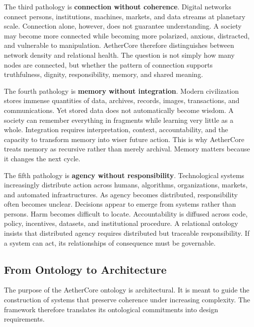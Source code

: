 \documentclass[12pt]{article}
\begin{document}
The third pathology is \textbf{connection without coherence}. Digital networks connect persons, institutions, machines, markets, and data streams at planetary scale. Connection alone, however, does not guarantee understanding. A society may become more connected while becoming more polarized, anxious, distracted, and vulnerable to manipulation. AetherCore therefore distinguishes between network density and relational health. The question is not simply how many nodes are connected, but whether the pattern of connection supports truthfulness, dignity, responsibility, memory, and shared meaning.

The fourth pathology is \textbf{memory without integration}. Modern civilization stores immense quantities of data, archives, records, images, transactions, and communications. Yet stored data does not automatically become wisdom. A society can remember everything in fragments while learning very little as a whole. Integration requires interpretation, context, accountability, and the capacity to transform memory into wiser future action. This is why AetherCore treats memory as recursive rather than merely archival. Memory matters because it changes the next cycle.

The fifth pathology is \textbf{agency without responsibility}. Technological systems increasingly distribute action across humans, algorithms, organizations, markets, and automated infrastructures. As agency becomes distributed, responsibility often becomes unclear. Decisions appear to emerge from systems rather than persons. Harm becomes difficult to locate. Accountability is diffused across code, policy, incentives, datasets, and institutional procedure. A relational ontology insists that distributed agency requires distributed but traceable responsibility. If a system can act, its relationships of consequence must be governable.


\subsection{From Ontology to Architecture}

The purpose of the AetherCore ontology is architectural. It is meant to guide the construction of systems that preserve coherence under increasing complexity. The framework therefore translates its ontological commitments into design requirements.
\end{document}
